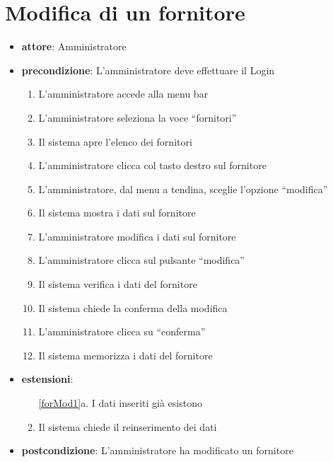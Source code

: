 \section{Modifica di un fornitore}
\begin{itemize}
	\item \textbf{attore}: Amministratore
	\item \textbf{precondizione}: L’amministratore deve effettuare il Login
	
	\begin{enumerate}
		\item L’amministratore accede alla menu bar
		\item L’amministratore seleziona la voce “fornitori”
		\item Il sistema apre l’elenco dei fornitori
		\item L’amministratore clicca col tasto destro sul fornitore
		\item L’amministratore, dal menu a tendina, sceglie l’opzione “modifica”
		\item Il sistema mostra i dati sul fornitore
		\item L’amministratore modifica i dati sul fornitore
		\item L’amministratore clicca sul pulsante “modifica”
		\label{forMod1}
		\item Il sistema verifica i dati del fornitore
		\item Il sistema chiede la conferma della modifica
		\item L’amministratore clicca su “conferma”
		\item Il sistema memorizza i dati del fornitore
	\end{enumerate}

	\item \textbf{estensioni}:
	\begin{enumerate}
		\item[\ref{forMod1}a.] I dati inseriti già esistono
		\item Il sistema chiede il reinserimento dei dati
	\end{enumerate}

	\item \textbf{postcondizione}: L’amministratore ha modificato un fornitore
\end{itemize}
		

